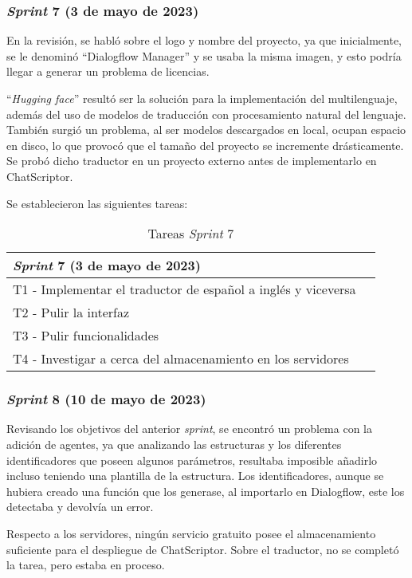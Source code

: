 \subsubsection{\textit{Sprint} 7 (3 de mayo de 2023)}
En la revisión, se habló sobre el logo y nombre del proyecto, ya que inicialmente, se le denominó ``Dialogflow Manager'' y se usaba la misma imagen, y esto podría llegar a generar un problema de licencias. 

``\textit{Hugging face}'' resultó ser la solución para la implementación del multilenguaje, además del uso de modelos de traducción con procesamiento natural del lenguaje. También surgió un problema, al ser modelos descargados en local, ocupan espacio en disco, lo que provocó que el tamaño del proyecto se incremente drásticamente. Se probó dicho traductor en un proyecto externo antes de implementarlo en ChatScriptor.

Se establecieron las siguientes tareas:
\begin{table}[H]
\centering
\begin{tabular}{ll}
\toprule
\textit{Sprint} 7 (3 de mayo de 2023)   \\
\midrule
T1 - Implementar el traductor de español a inglés y viceversa\\
T2 - Pulir la interfaz\\
T3 - Pulir funcionalidades\\
T4 - Investigar a cerca del almacenamiento en los servidores\\
\bottomrule
\end{tabular}
\caption{Tareas \textit{Sprint} 7}
\end{table}

\subsubsection{\textit{Sprint} 8 (10 de mayo de 2023)}
Revisando los objetivos del anterior \textit{sprint}, se encontró un problema con la adición de agentes, ya que analizando las estructuras y los diferentes identificadores que poseen algunos parámetros, resultaba imposible añadirlo incluso teniendo una plantilla de la estructura. Los identificadores, aunque se hubiera creado una función que los generase, al importarlo en Dialogflow, este los detectaba y devolvía un error.

Respecto a los servidores, ningún servicio gratuito posee el almacenamiento suficiente para el despliegue de ChatScriptor. Sobre el traductor, no se completó la tarea, pero estaba en proceso.

